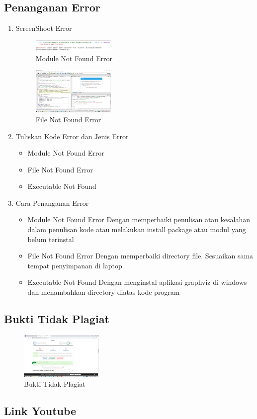 \subsection{Penanganan Error}
\begin{enumerate}
\item ScreenShoot Error
	\begin{figure}[H]
		\includegraphics[width=4cm]{figures/1174053/error/error1.png}
		\centering
		\caption{Module Not Found Error}
	\end{figure}
	\begin{figure}[H]
		\includegraphics[width=4cm]{figures/1174053/error/error2.png}
		\centering
		\caption{File Not Found Error}
	\end{figure}
\item Tuliskan Kode Error dan Jenis Error
	\begin{itemize}
		\item Module Not Found Error
		\item File Not Found Error
		\item Executable Not Found
	\end{itemize}
\item Cara Penanganan Error
	\begin{itemize}
	\item Module Not Found Error
		\hfill\break
		Dengan memperbaiki penulisan atau kesalahan dalam penulisan kode atau melakukan install package atau modul yang belum terinstal
	\item File Not Found Error
		\hfill\break
		Dengan memperbaiki directory file. Sesuaikan sama tempat penyimpanan di laptop
	\item Executable Not Found
		\hfill\break
		Dengan menginstal aplikasi graphviz di windows dan menambahkan directory diatas kode program
	\end{itemize}
\end{enumerate}
\subsection{Bukti Tidak Plagiat}
\begin{figure}[H]
	\includegraphics[width=4cm]{figures/1174053/plagiat/plagiat2.png}
	\centering
	\caption{Bukti Tidak Plagiat}
\end{figure}
\subsection{Link Youtube}
